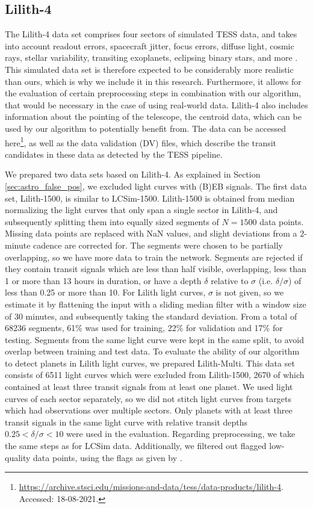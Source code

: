 \subsection{Lilith-4}
\label{sec:lilith-4}

The Lilith-4 data set comprises four sectors of simulated TESS data, and takes into account readout errors, spacecraft jitter, focus errors, diffuse light, cosmic rays, stellar variability, transiting exoplanets, eclipsing binary stars, and more \citep{smith2019four}. This simulated data set is therefore expected to be considerably more realistic than ours, which is why we include it in this research.  Furthermore, it allows for the evaluation of certain preprocessing steps in combination with our algorithm, that would be necessary in the case of using real-world data. Lilith-4 also includes information about the pointing of the telescope, the centroid data, which can be used by our algorithm to potentially benefit from. The data can be accessed here\footnote{\url{https://archive.stsci.edu/missions-and-data/tess/data-products/lilith-4}. Accessed: 18-08-2021.}, as well as the data validation (DV) files, which describe the transit candidates in these data as detected by the TESS pipeline.

We prepared two data sets based on Lilith-4. As explained in Section \ref{sec:astro_false_pos}, we excluded light curves with (B)EB signals. The first data set, Lilith-1500, is similar to LCSim-1500. Lilith-1500 is obtained from median normalizing the light curves that only span a single sector in Lilith-4, and subsequently splitting them into equally sized segments of $N=1500$ data points. Missing data points are replaced with NaN values, and slight deviations from a 2-minute cadence are corrected for. The segments were chosen to be partially overlapping, so we have more data to train the network. Segments are rejected if they contain transit signals which are less than half visible, overlapping, less than 1 or more than 13 hours in duration, or have a depth $\delta$ relative to $\sigma$ (i.e. $\delta/\sigma$) of less than 0.25 or more than 10. For Lilith light curves, $\sigma$  is not given, so we estimate it by flattening the input with a sliding median filter with a window size of 30 minutes, and subsequently taking the standard deviation. From a total of 68236 segments, 61\% was used for training, 22\% for validation and 17\% for testing. Segments from the same light curve were kept in the same split, to avoid overlap between training and test data. To evaluate the ability of our algorithm to detect planets in Lilith light curves, we prepared Lilith-Multi. This data set consists of 6511 light curves which were excluded from Lilith-1500, 2670 of which contained at least three transit signals from at least one planet. We used light curves of each sector separately, so we did not stitch light curves from targets which had observations over multiple sectors. Only planets with at least three transit signals in the same light curve with relative transit depths $0.25 < \delta/\sigma < 10$ were used in the evaluation. Regarding preprocessing, we take the same steps as for LCSim data. Additionally, we filtered out flagged low-quality data points, using the flags as given by \cite{tenenbaum2018tess}.

